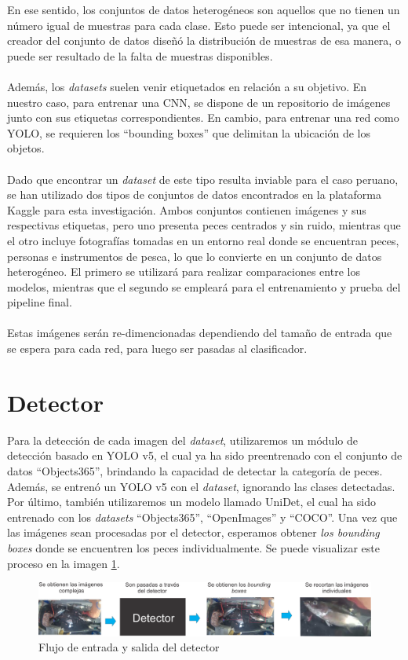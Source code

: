 En ese sentido, los conjuntos de datos heterogéneos son aquellos que no tienen un número igual de muestras para cada clase. Esto puede ser intencional, ya que el creador del conjunto de datos diseñó la distribución de muestras de esa manera, o puede ser resultado de la falta de muestras disponibles.
\\\\
Además, los \textit{datasets} suelen venir etiquetados en relación a su objetivo. En nuestro caso, para entrenar una CNN, se dispone de un repositorio de imágenes junto con sus etiquetas correspondientes. En cambio, para entrenar una red como YOLO, se requieren los ``bounding boxes'' que delimitan la ubicación de los objetos.
\\\\

Dado que encontrar un \textit{dataset} de este tipo resulta inviable para el caso peruano, se han utilizado dos tipos de conjuntos de datos encontrados en la plataforma Kaggle para esta investigación. Ambos conjuntos contienen imágenes y sus respectivas etiquetas, pero uno presenta peces centrados y sin ruido, mientras que el otro incluye fotografías tomadas en un entorno real donde se encuentran peces, personas e instrumentos de pesca, lo que lo convierte en un conjunto de datos heterogéneo. El primero se utilizará para realizar comparaciones entre los modelos, mientras que el segundo se empleará para el entrenamiento y prueba del pipeline final.
\\\\
Estas imágenes serán re-dimencionadas dependiendo del tamaño de entrada que se espera para cada red, para luego ser pasadas al clasificador.

\section{Detector}
Para la detección de cada imagen del \textit{dataset}, utilizaremos un módulo de detección basado en YOLO v5, el cual ya ha sido preentrenado con el conjunto de datos ``Objects365'', brindando la capacidad de detectar la categoría de peces. Además, se entrenó un YOLO v5 con el \textit{dataset}, ignorando las clases detectadas. Por último, también utilizaremos un modelo llamado UniDet, el cual ha sido entrenado con los \textit{datasets} ``Objects365'', ``OpenImages'' y ``COCO''.  Una vez que las imágenes sean procesadas por el detector, esperamos obtener \textit{los bounding boxes} donde se encuentren los peces individualmente. Se puede visualizar este proceso en la imagen \ref{fig:detector_pez}.
\begin{figure}[h!]
\includegraphics[width=1\textwidth]{images/detector_pez.png}
\caption{Flujo de entrada y salida del detector }
\label{fig:detector_pez}
\end{figure}




